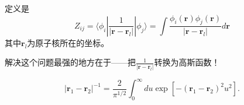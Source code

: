 \documentclass[12pt,a4paper,openany,twoside]{article}
\numberwithin{equation}{section}
\begin{document}
                定义是
                \begin{equation}
                    Z_{ij} = \langle \phi_i | \frac{1}{|\boldsymbol{r} - \boldsymbol{r}_l|} |\phi_j \rangle = \int \frac{\phi_i(\boldsymbol{r}) \phi_j(\boldsymbol{r})}{|\boldsymbol{r} - \boldsymbol{r}_l|} d \boldsymbol{r} 
                \end{equation}
                其中$\boldsymbol{r}_l$为原子核所在的坐标。

                解决这个问题最强的地方在于——把$\frac{1}{|\boldsymbol{r} - \boldsymbol{r}_l|}$转换为高斯函数！

                \begin{equation}
                    \left|\boldsymbol{r}_{1}-\boldsymbol{r}_{2}\right|^{-1}=\frac{2}{\pi^{1 / 2}} \int_{0}^{\infty} d u \exp \left[-\left(\boldsymbol{r}_{1}-\boldsymbol{r}_{2}\right)^{2} u^{2}\right].
                \end{equation}
\end{document}
